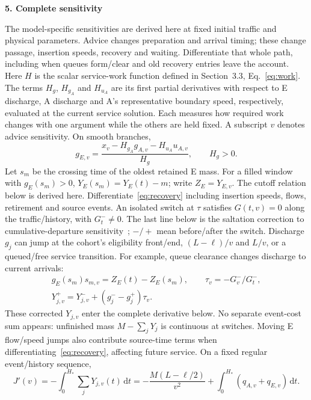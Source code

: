 \documentclass[10pt,a4paper]{article}
\newcommand{\dd}{\,\mathrm d}
\newcommand{\head}[1]{\par\vspace{4pt}\noindent\textbf{#1}\par\nobreak\vspace{1pt}}
\begin{document}
\newpage
\head{5. Complete sensitivity}
The model-specific sensitivities are derived here at fixed initial traffic
and physical parameters.
Advice changes preparation and arrival timing; these change passage,
insertion speeds, recovery and waiting. Differentiate that whole path,
including when queues form/clear and old recovery entries leave the account.
Here $H$ is the scalar service-work function defined in Section~3.3,
Eq.~\eqref{eq:work}. The terms $H_g$, $H_{g_A}$ and $H_{u_A}$ are its first
partial derivatives with respect to E discharge, A discharge and A's
representative boundary speed, respectively, evaluated at the current
service solution. Each measures how required work changes with one argument
while the others are held fixed.
A subscript $v$ denotes advice sensitivity. On smooth branches,
\begin{equation}
 g_{E,v}=\frac{x_v-H_{g_A}g_{A,v}-H_{u_A}u_{A,v}}{H_g},\qquad H_g>0.
 \label{eq:rootgradient}
\end{equation}
Let $s_m$ be the crossing time of the oldest retained E mass. For a filled
window with $g_E(s_m)>0$, $Y_E(s_m)=Y_E(t)-m$; write $Z_E=Y_{E,v}$.
The cutoff relation below is derived here. Differentiate~\eqref{eq:recovery}
including insertion speeds, flows, retirement and source events.
An isolated switch at $\tau$ satisfies $G(t,v)=0$ along the traffic/history,
with $G_t^-\ne0$. The last line below is the saltation correction to
cumulative-departure sensitivity~\cite{kong}; $-/+$ mean before/after the switch.
Discharge $g_j$ can jump at the cohort's eligibility front/end,
$(L-\ell)/v$ and $L/v$, or a queued/free service transition.
For example, queue clearance changes discharge to current arrivals:
\begin{equation}
 \begin{gathered}
 g_E(s_m)s_{m,v}=Z_E(t)-Z_E(s_m),\qquad \tau_v=-G_v^-/G_t^-,\\
 Y_{j,v}^+=Y_{j,v}^-+(g_j^- -g_j^+)\tau_v.
 \end{gathered}
 \label{eq:eventgradient}
\end{equation}
These corrected $Y_{j,v}$ enter the complete derivative below.
No separate event-cost sum appears: unfinished mass $M-\sum_jY_j$ is
continuous at switches. Moving E flow/speed jumps also contribute source-time
terms when differentiating~\eqref{eq:recovery}, affecting future service.
On a fixed regular event/history sequence,
\begin{equation}
 J'(v)=-\int_0^{H_*}\!\sum_jY_{j,v}(t)\dd t
 =-\frac{M(L-\ell/2)}{v^2}+\int_0^{H_*}(q_{A,v}+q_{E,v})\dd t.
 \label{eq:objectivegradient}
\end{equation}
\end{document}
